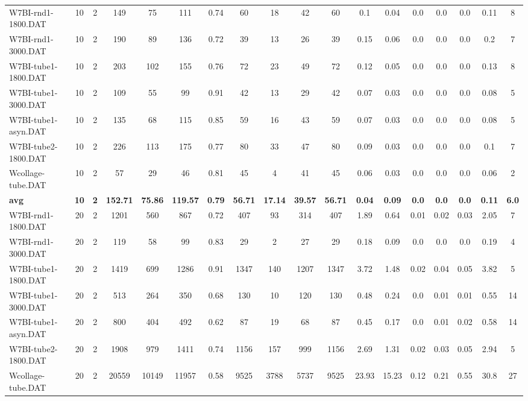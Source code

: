 \begin{sidewaystable}[h]
{\begin{tabular}{lccccccccccccccccc}
W7BI-rnd1-1800.DAT & 10 & 2 & 149 & 75 & 111 & 0.74 & 60 & 18 & 42 & 60 & 0.1 & 0.04 & 0.0 & 0.0 & 0.0 & 0.11 & 8\\
W7BI-rnd1-3000.DAT & 10 & 2 & 190 & 89 & 136 & 0.72 & 39 & 13 & 26 & 39 & 0.15 & 0.06 & 0.0 & 0.0 & 0.0 & 0.2 & 7\\
W7BI-tube1-1800.DAT & 10 & 2 & 203 & 102 & 155 & 0.76 & 72 & 23 & 49 & 72 & 0.12 & 0.05 & 0.0 & 0.0 & 0.0 & 0.13 & 8\\
W7BI-tube1-3000.DAT & 10 & 2 & 109 & 55 & 99 & 0.91 & 42 & 13 & 29 & 42 & 0.07 & 0.03 & 0.0 & 0.0 & 0.0 & 0.08 & 5\\
W7BI-tube1-asyn.DAT & 10 & 2 & 135 & 68 & 115 & 0.85 & 59 & 16 & 43 & 59 & 0.07 & 0.03 & 0.0 & 0.0 & 0.0 & 0.08 & 5\\
W7BI-tube2-1800.DAT & 10 & 2 & 226 & 113 & 175 & 0.77 & 80 & 33 & 47 & 80 & 0.09 & 0.03 & 0.0 & 0.0 & 0.0 & 0.1 & 7\\
Wcollage-tube.DAT & 10 & 2 & 57 & 29 & 46 & 0.81 & 45 & 4 & 41 & 45 & 0.06 & 0.03 & 0.0 & 0.0 & 0.0 & 0.06 & 2\\
\cline{1-18} \textbf{avg} & \textbf{10} & \textbf{2} & \textbf{152.71} & \textbf{75.86} & \textbf{119.57} & \textbf{0.79} & \textbf{56.71} & \textbf{17.14} & \textbf{39.57} & \textbf{56.71} & \textbf{0.04} & \textbf{0.09} & \textbf{0.0} & \textbf{0.0} & \textbf{0.0} & \textbf{0.11} & \textbf{6.0} \\ \cline{1-18}
W7BI-rnd1-1800.DAT & 20 & 2 & 1201 & 560 & 867 & 0.72 & 407 & 93 & 314 & 407 & 1.89 & 0.64 & 0.01 & 0.02 & 0.03 & 2.05 & 7\\
W7BI-rnd1-3000.DAT & 20 & 2 & 119 & 58 & 99 & 0.83 & 29 & 2 & 27 & 29 & 0.18 & 0.09 & 0.0 & 0.0 & 0.0 & 0.19 & 4\\
W7BI-tube1-1800.DAT & 20 & 2 & 1419 & 699 & 1286 & 0.91 & 1347 & 140 & 1207 & 1347 & 3.72 & 1.48 & 0.02 & 0.04 & 0.05 & 3.82 & 5\\
W7BI-tube1-3000.DAT & 20 & 2 & 513 & 264 & 350 & 0.68 & 130 & 10 & 120 & 130 & 0.48 & 0.24 & 0.0 & 0.01 & 0.01 & 0.55 & 14\\
W7BI-tube1-asyn.DAT & 20 & 2 & 800 & 404 & 492 & 0.62 & 87 & 19 & 68 & 87 & 0.45 & 0.17 & 0.0 & 0.01 & 0.02 & 0.58 & 14\\
W7BI-tube2-1800.DAT & 20 & 2 & 1908 & 979 & 1411 & 0.74 & 1156 & 157 & 999 & 1156 & 2.69 & 1.31 & 0.02 & 0.03 & 0.05 & 2.94 & 5\\
Wcollage-tube.DAT & 20 & 2 & 20559 & 10149 & 11957 & 0.58 & 9525 & 3788 & 5737 & 9525 & 23.93 & 15.23 & 0.12 & 0.21 & 0.55 & 30.8 & 27\\

\end{tabular}}
\end{sidewaystable}
